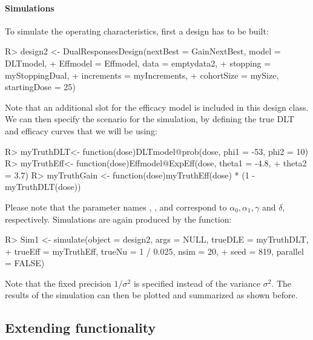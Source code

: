 \documentclass[article]{jss}\usepackage[]{graphicx}\usepackage[]{color}
\begin{document}
\paragraph{Simulations} To simulate the operating characteristics, first a design has to be built: 
\begin{Schunk}
\begin{Sinput}
R> design2 <- DualResponsesDesign(nextBest = GainNextBest, model = DLTmodel,
+                                 Effmodel = Effmodel, data = emptydata2,
+                                 stopping = myStoppingDual, 
+                                 increments = myIncrements, 
+                                 cohortSize = mySize, startingDose = 25)
\end{Sinput}
\end{Schunk}
Note that an additional slot for the efficacy model is included in this design class. We can then specify the scenario for the simulation, by defining the true DLT and efficacy curves that we will be using:
\begin{Schunk}
\begin{Sinput}
R> myTruthDLT<- function(dose){DLTmodel@prob(dose, phi1 = -53, phi2 = 10)}
R> myTruthEff<- function(dose){Effmodel@ExpEff(dose, theta1 = -4.8, 
+                                              theta2 = 3.7)}
R> myTruthGain <- function(dose){myTruthEff(dose) * (1 - myTruthDLT(dose))}
\end{Sinput}
\end{Schunk}
Please note that the parameter names , ,  and 
 correspond to $\alpha_0, \alpha_1, \gamma$ and $\delta$, respectively.
Simulations are again produced by the  function:
\begin{Schunk}
\begin{Sinput}
R> Sim1 <- simulate(object = design2, args = NULL, trueDLE = myTruthDLT,
+                   trueEff = myTruthEff, trueNu = 1 / 0.025, nsim = 20, 
+                   seed = 819, parallel = FALSE)
\end{Sinput}
\end{Schunk}
Note that the fixed precision  $1/\sigma^{2}$ is specified instead of the
variance $\sigma^{2}$.
%
The results of the simulation can then be plotted and summarized as shown before.

\subsection[Extending crmPack functionality]{Extending  functionality}
\label{subsec:extending}
\end{document}
